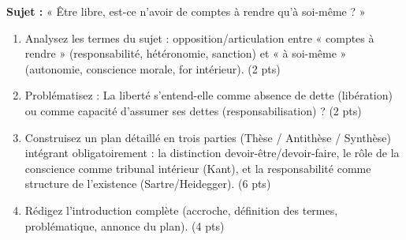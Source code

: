 \documentclass[11pt]{article}
\begin{document}
\begin{exercice}
\textbf{Sujet :} « Être libre, est-ce n'avoir de comptes à rendre qu'à soi-même ? »
\begin{enumerate}
    \item Analysez les termes du sujet : opposition/articulation entre « comptes à rendre » (responsabilité, hétéronomie, sanction) et « à soi-même » (autonomie, conscience morale, for intérieur). (2 pts)
    \item Problématisez : La liberté s'entend-elle comme absence de dette (libération) ou comme capacité d'assumer ses dettes (responsabilisation) ? (2 pts)
    \item Construisez un plan détaillé en trois parties (Thèse / Antithèse / Synthèse) intégrant obligatoirement : la distinction devoir-être/devoir-faire, le rôle de la conscience comme tribunal intérieur (Kant), et la responsabilité comme structure de l'existence (Sartre/Heidegger). (6 pts)
    \item Rédigez l'introduction complète (accroche, définition des termes, problématique, annonce du plan). (4 pts)
\end{enumerate}
\end{exercice}
\end{document}
